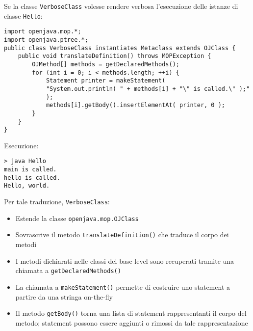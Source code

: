 Se la classe \texttt{VerboseClass} volesse rendere verbosa l'esecuzione delle istanze di classe \texttt{Hello}:
\begin{verbatim}
import openjava.mop.*;
import openjava.ptree.*;
public class VerboseClass instantiates Metaclass extends OJClass {
    public void translateDefinition() throws MOPException {
        OJMethod[] methods = getDeclaredMethods();
        for (int i = 0; i < methods.length; ++i) {
            Statement printer = makeStatement(
            "System.out.println( " + methods[i] + "\" is called.\" );"
            );
            methods[i].getBody().insertElementAt( printer, 0 );
        }
    }
}
\end{verbatim}

Esecuzione:
\begin{verbatim}
> java Hello
main is called.
hello is called.
Hello, world.
\end{verbatim}

Per tale traduzione, \texttt{VerboseClass}:
\begin{itemize}
    \item Estende la classe \texttt{openjava.mop.OJClass}

    \item Sovrascrive il metodo \texttt{translateDefinition()} che traduce il corpo dei metodi

    \item I metodi dichiarati nelle classi del base-level sono recuperati tramite una chiamata a \texttt{getDeclaredMethods()}

    \item La chiamata a \texttt{makeStatement()} permette di costruire uno statement a partire da una stringa on-the-fly

    \item Il metodo \texttt{getBody()} torna una lista di statement rappresentanti il corpo del metodo; statement possono essere aggiunti o rimossi da tale rappresentazione
\end{itemize}


